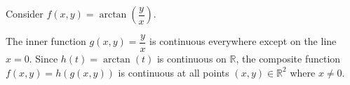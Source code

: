 \begin{example}
Consider $f(x,y) = \arctan\left(\dfrac{y}{x}\right)$. 

The inner function $g(x,y) = \dfrac{y}{x}$ is continuous everywhere except on the line $x = 0$. Since $h(t) = \arctan(t)$ is continuous on $\mathbb{R}$, the composite function $f(x,y) = h(g(x,y))$ is continuous at all points $(x,y) \in \mathbb{R}^2$ where $x \neq 0$.
\end{example}